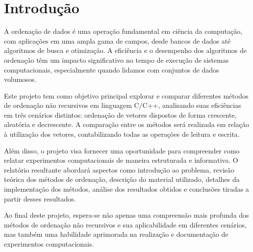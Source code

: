 \section{Introdução}
A ordenação de dados é uma operação fundamental em ciência da computação, com aplicações em uma ampla gama de campos, desde bancos de dados até algoritmos de busca e otimização. A eficiência e o desempenho dos algoritmos de ordenação têm um impacto significativo no tempo de execução de sistemas computacionais, especialmente quando lidamos com conjuntos de dados volumosos.

Este projeto tem como objetivo principal explorar e comparar diferentes métodos de ordenação não recursivos em linguagem C/C++, analisando suas eficiências em três cenários distintos: ordenação de vetores dispostos de forma crescente, aleatória e decrescente. A comparação entre os métodos será realizada em relação à utilização dos vetores, contabilizando todas as operações de leitura e escrita.

Além disso, o projeto visa fornecer uma oportunidade para compreender como relatar experimentos computacionais de maneira estruturada e informativa. O relatório resultante abordará aspectos como introdução ao problema, revisão teórica dos métodos de ordenação, descrição do material utilizado, detalhes da implementação dos métodos, análise dos resultados obtidos e conclusões tiradas a partir desses resultados.

Ao final deste projeto, espera-se não apenas uma compreensão mais profunda dos métodos de ordenação não recursivos e sua aplicabilidade em diferentes cenários, mas também uma habilidade aprimorada na realização e documentação de experimentos computacionais.